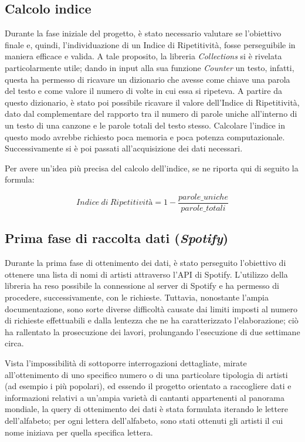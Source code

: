 \documentclass[fleqn,10pt]{SelfArx} %
\begin{document}
\subsection{Calcolo indice}
Durante la fase iniziale del progetto, è stato necessario valutare se l’obiettivo finale e, quindi, l’individuazione di un Indice di Ripetitività, fosse perseguibile in maniera efficace e valida. A tale proposito, la libreria \textit{Collections} si è rivelata particolarmente utile; dando in input alla sua funzione \textit{Counter} un testo, infatti, questa ha permesso di ricavare un dizionario che avesse come chiave una parola del testo e come valore il numero di volte in cui essa si ripeteva.
A partire da questo dizionario, è stato poi possibile ricavare il valore dell’Indice di Ripetitività, dato dal complementare del rapporto tra il numero di parole uniche all’interno di un testo di una canzone e le parole totali del testo stesso. 
Calcolare l’indice in questo modo avrebbe richiesto poca memoria e poca potenza computazionale.
Successivamente si è poi passati all’acquisizione dei dati necessari.

Per avere un'idea più precisa del calcolo dell'indice, se ne riporta qui di seguito la formula:

$$ Indice\:di\:Ripetitività = 1 -  \frac{parole\_uniche}{parole\_totali} $$

\subsection{Prima fase di raccolta dati (\textit{Spotify})}
Durante la prima fase di ottenimento dei dati, è stato perseguito l’obiettivo di ottenere una lista di nomi di artisti attraverso l’API di Spotify. L’utilizzo della libreria  ha reso possibile la connessione al server di Spotify e ha permesso di procedere, successivamente, con le richieste. Tuttavia, nonostante l’ampia documentazione, sono sorte diverse difficoltà causate dai limiti imposti al numero di richieste effettuabili e dalla lentezza che ne ha caratterizzato l’elaborazione; ciò ha rallentato la prosecuzione dei lavori, prolungando l’esecuzione di due settimane circa.

Vista l’impossibilità di sottoporre interrogazioni dettagliate, mirate all’ottenimento di uno specifico numero o di una particolare tipologia di artisti (ad esempio i più popolari), ed essendo il progetto orientato a raccogliere dati e informazioni relativi a un’ampia varietà di cantanti appartenenti al panorama mondiale, la query di ottenimento dei dati è stata formulata iterando le lettere dell’alfabeto; per ogni lettera dell’alfabeto, sono stati ottenuti gli artisti il cui nome iniziava per quella specifica lettera.
\end{document}
